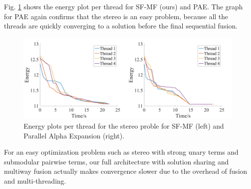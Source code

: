 %
%
%
Fig. \ref{fig:stereo_threads} shows the energy plot per thread
for SF-MF (ours) and PAE. The graph for PAE again confirms that the
stereo is an easy problem, because all the threads are quickly
converging to a solution before the final sequential fusion.
\begin{figure}[tb]
  \includegraphics[width=\columnwidth]{figure/stereo_threads.png}
  \caption{Energy plots per thread for the stereo proble for SF-MF (left) and
 Parallel Alpha Expansion (right).
} \label{fig:stereo_threads}
\end{figure}

For an easy optimization problem such as stereo with strong unary terms
and submodular pairwise terms, our full architecture with solution
sharing and multiway fusion actually makes convergence slower due to the
overhead of fusion and multi-threading.










